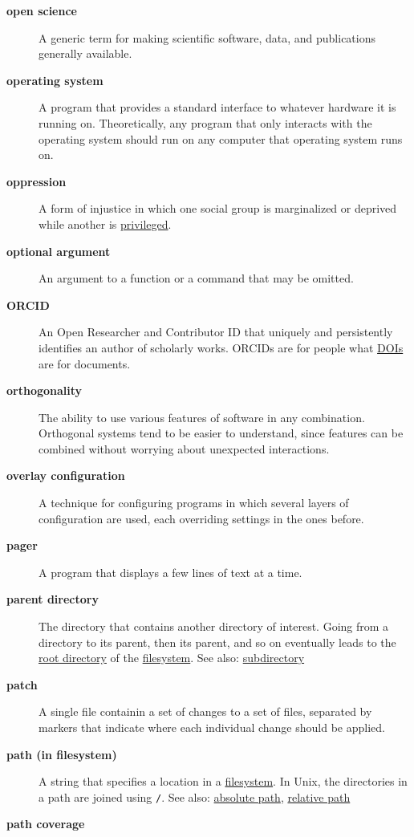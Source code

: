 \documentclass[
]{krantz}
\begin{document}
\begin{description}
\item[\textbf{open science}]
A generic term for making scientific software, data, and publications generally available.
\item[\textbf{operating system}]
A program that provides a standard interface to whatever hardware it is running on. Theoretically, any program that only interacts with the operating system should run on any computer that operating system runs on.
\item[\textbf{oppression}]
A form of injustice in which one social group is marginalized or deprived while another is \protect\hyperlink{privilege}{privileged}.
\item[\textbf{optional argument}]
An argument to a function or a command that may be omitted.
\item[\textbf{ORCID}]
An Open Researcher and Contributor ID that uniquely and persistently identifies an author of scholarly works. ORCIDs are for people what \protect\hyperlink{doi}{DOIs} are for documents.
\item[\textbf{orthogonality}]
The ability to use various features of software in any combination. Orthogonal systems tend to be easier to understand, since features can be combined without worrying about unexpected interactions.
\item[\textbf{overlay configuration}]
A technique for configuring programs in which several layers of configuration are used, each overriding settings in the ones before.
\item[\textbf{pager}]
A program that displays a few lines of text at a time.
\item[\textbf{parent directory}]
The directory that contains another directory of interest. Going from a directory to its parent, then its parent, and so on eventually leads to the \protect\hyperlink{root_directory}{root directory} of the \protect\hyperlink{filesystem}{filesystem}. See also: \protect\hyperlink{subdirectory}{subdirectory}
\item[\textbf{patch}]
A single file containin a set of changes to a set of files, separated by markers that indicate where each individual change should be applied.
\item[\textbf{path (in filesystem)}]
A string that specifies a location in a \protect\hyperlink{filesystem}{filesystem}. In Unix, the directories in a path are joined using \texttt{/}. See also: \protect\hyperlink{absolute_path}{absolute path}, \protect\hyperlink{relative_path}{relative path}
\item[\textbf{path coverage}]

\end{description}
\end{document}
